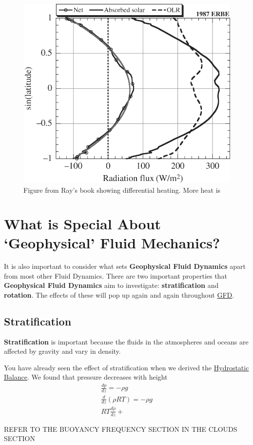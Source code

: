 \begin{figure}[H]
    \centering
    \includegraphics[width=0.5\linewidth]{Figures/GFD/Diff Heating.jpg}
    \caption{Figure from Ray's book showing differential heating. More heat is }
    \label{Diff Heating}
\end{figure}



\section{What is Special About `Geophysical' Fluid Mechanics?}\label{GFD Special}

It is also important to consider what sets \textbf{Geophysical Fluid Dynamics} apart from most other Fluid Dynamics. There are two important properties that \textbf{Geophysical Fluid Dynamics} aim to investigate: \textbf{stratification} and \textbf{rotation}. The effects of these will pop up again and again throughout \hyperref[Geophysical Fluid Dynamics]{GFD}.

\subsection{Stratification}

\textbf{Stratification} is important because the fluids in the atmospheres and oceans are affected by gravity and vary in density. 

You have already seen the effect of stratification when we derived the \hyperref[Hydrostatic Balance]{Hydrostatic Balance}. We found that pressure decreases with height 
\begin{align*}
    \frac{dp}{dz}=-\rho g\\
    \frac{d}{dz}\left( \rho R T \right)=-\rho g\\
    RT \frac{d \rho}{dz} + \frac{}{}
\end{align*}

REFER TO THE BUOYANCY FREQUENCY SECTION IN THE CLOUDS SECTION

